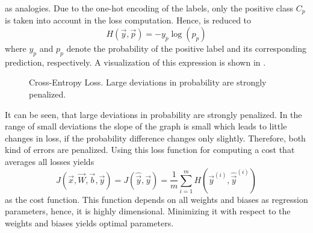 as analogies.
Due to the one-hot encoding of the labels, only the positive class $C_p$ is taken into account in the loss computation.
Hence,  is reduced to
\begin{equation}
	\label{eq:cross-entropy-loss-compact}
	H(\vec{y}, \vec{p}) = - y_p \log (p_p)
\end{equation}
where $y_p$ and $p_p$ denote the probability of the positive label and its corresponding prediction, respectively.
A visualization of this expression is shown in .
\begin{figure}
	\setlength{}
	\setlength{}
	\centering
	
	\caption[Cross-Entropy Loss]{Cross-Entropy Loss. Large deviations in probability are strongly penalized.}
	\label{fig:cross-entropy}
\end{figure}
It can be seen, that large deviations in probability are strongly penalized.
In the range of small deviations the slope of the graph is small which leads to little changes in loss, if the probability difference changes only slightly.
Therefore, both kind of errors are penalized.
Using this loss function for computing a cost that averages all losses yields
\begin{equation}
	\label{eq:cross-entropy-cost}
	J(\vec{x}, \vec{W}, \vec{b}, \vec{y}) = J(\hat{\vec{y}}, \vec{y}) = \frac{1}{m} \sum_{i=1}^{m} H(\vec{y}^{(i)}, \hat{\vec{y}}^{(i)})
\end{equation}
as the cost function.
This function depends on all weights and biases as regression parameters, hence, it is highly dimensional.
Minimizing it with respect to the weights and biases yields optimal parameters.